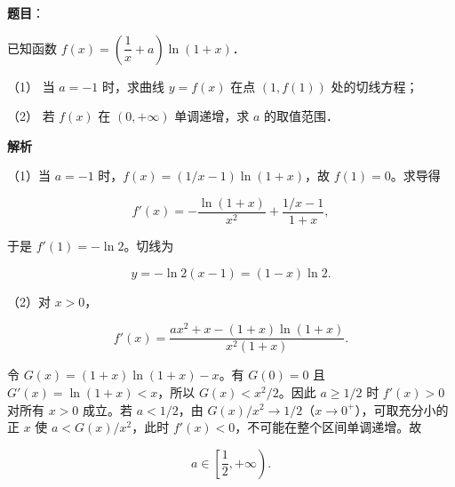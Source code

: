 \begin{answer}

\textbf{题目}：

已知函数 $f(x)=\left(\dfrac1x+a\right)\ln(1+x)$．

（1） 当 $a=-1$ 时，求曲线 $y=f(x)$ 在点 $(1,f(1))$ 处的切线方程；

（2） 若 $f(x)$ 在 $(0,+\infty)$ 单调递增，求 $a$ 的取值范围．

\textbf{解析}


（1）当 $a=-1$ 时，$f(x)=(1/x-1)\ln(1+x)$，故 $f(1)=0$。求导得

\nopagebreak[4]
\[
f'(x)=-\frac{\ln(1+x)}{x^2}+\frac{1/x-1}{1+x},
\]

于是 $f'(1)=-\ln2$。切线为

\nopagebreak[4]
\[
y=-\ln2(x-1)=(1-x)\ln2.
\]


（2）对 $x>0$，

\nopagebreak[4]
\[
f'(x)=\frac{a x^2+x-(1+x)\ln(1+x)}{x^2(1+x)}.
\]

令 $G(x)=(1+x)\ln(1+x)-x$。有 $G(0)=0$ 且 $G'(x)=\ln(1+x)<x$，所以 $G(x)<x^2/2$。因此 $a\geqslant1/2$ 时 $f'(x)>0$ 对所有 $x>0$ 成立。若 $a<1/2$，由 $G(x)/x^2\to1/2$（$x\to0^+$），可取充分小的正 $x$ 使 $a<G(x)/x^2$，此时 $f'(x)<0$，不可能在整个区间单调递增。故

\nopagebreak[4]
\[
a\in\left[\frac12,+\infty\right).
\]


\gkanswer{答案（2）：$a\in[\dfrac12,+\infty)$}

\end{answer}
